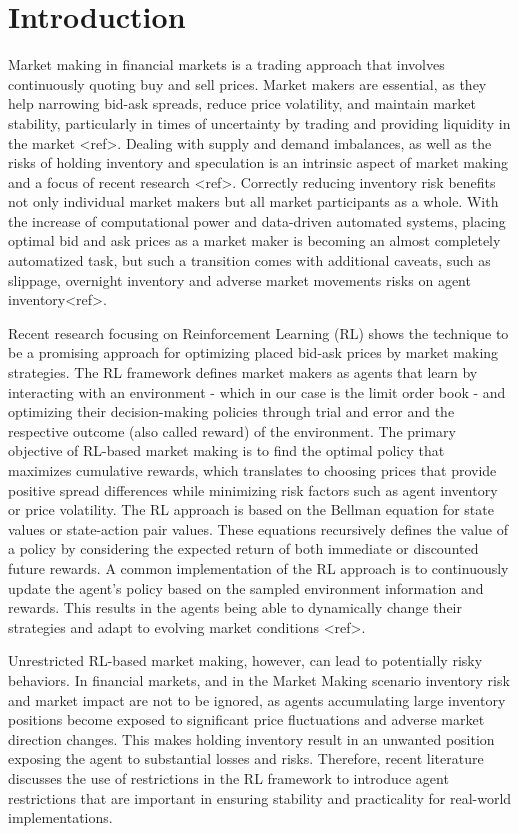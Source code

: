\section{Introduction}

Market making in financial markets is a trading approach that involves continuously quoting buy and sell prices. Market makers are essential, as they help narrowing bid-ask spreads, reduce price volatility, and maintain market stability, particularly in times of uncertainty by trading and providing liquidity in the market <ref>. Dealing with supply and demand imbalances, as well as the risks of holding inventory and speculation is an intrinsic aspect of market making and a focus of recent research <ref>. Correctly reducing inventory risk benefits not only individual market makers but all market participants as a whole. With the increase of computational power and data-driven automated systems, placing optimal bid and ask prices as a market maker is becoming an almost completely automatized task, but such a transition comes with additional caveats, such as slippage, overnight inventory and adverse market movements risks on agent inventory<ref>. 

Recent research focusing on Reinforcement Learning (RL) shows the technique to be a promising approach for optimizing placed bid-ask prices by market making strategies. The RL framework defines market makers as agents that learn by interacting with an environment - which in our case is the limit order book - and optimizing their decision-making policies through trial and error and the respective outcome (also called reward) of the environment. The primary objective of RL-based market making is to find the optimal policy that maximizes cumulative rewards, which translates to choosing prices that provide positive spread differences while minimizing risk factors such as agent inventory or price volatility. The RL approach is based on the Bellman equation for state values or state-action pair values. These equations recursively defines the value of a policy by considering the expected return of both immediate or discounted future rewards. A common implementation of the RL approach is to continuously update the agent's policy based on the sampled environment information and rewards. This results in the agents being able to dynamically change their strategies and adapt to evolving market conditions <ref>. 

Unrestricted RL-based market making, however, can lead to potentially risky behaviors. In financial markets, and in the Market Making scenario inventory risk and market impact are not to be ignored, as agents accumulating large inventory positions become exposed to significant price fluctuations and adverse market direction changes. This makes holding inventory result in an unwanted position exposing the agent to substantial losses and risks. Therefore, recent literature discusses the use of restrictions in the RL framework to introduce agent restrictions that are important in ensuring stability and practicality for real-world implementations. 

